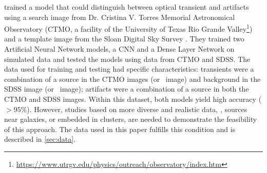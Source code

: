 \cite{wardega2020detecting} trained a model that could distinguish between optical transient and artifacts using a search image from Dr. Cristina V. Torres Memorial Astronomical Observatory (CTMO, a facility of the University of Texas Rio Grande Valley\footnote{\url{https://www.utrgv.edu/physics/outreach/observatory/index.htm}}) and a template image from the Sloan Digital Sky Survey \citep[SDSS]{Gunn_2006}. They trained two Artificial Neural Network models, a CNN and a Dense Layer Network on simulated data and tested the models using data from CTMO and SDSS. The data used for training and testing had specific characteristics: transients were a combination of a source in the CTMO images (or \search\ image) and background in the SDSS image (or \temp\ image); artifacts were a combination of a source in both the CTMO and SDSS images. Within this dataset, both models yield high accuracy ($>95\%$).  However, studies based on more diverse and realistic data, \eg, sources near galaxies, or embedded in clusters, are needed to demonstrate the feasibility of this approach. The data used in this paper fulfills this condition and is described in \autoref{sec:data}.
